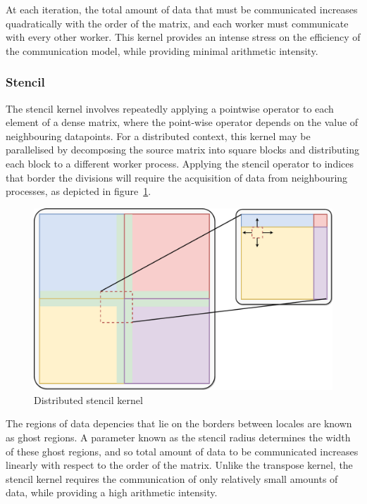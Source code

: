 At each iteration, the total amount of data that must be communicated
increases quadratically with the order of the matrix, and each worker
must communicate with every other worker. This kernel provides an
intense stress on the efficiency of the communication model, while
providing minimal arithmetic intensity.

\subsubsection{Stencil}

The stencil kernel involves repeatedly applying a pointwise operator to
each element of a dense matrix, where the point-wise operator depends on
the value of neighbouring datapoints. For a distributed context, this
kernel may be parallelised by decomposing the source matrix into square
blocks and distributing each block to a different worker process.
Applying the stencil operator to indices that border the divisions will
require the acquisition of data from neighbouring processes, as depicted
in figure~\ref{fig:stencil-diagram}.

\begin{figure}[htb]
  \includegraphics[width=\linewidth]{figs/Stencil.pdf}
  \caption{Distributed stencil kernel}
  \label{fig:stencil-diagram}
\end{figure}

The regions of data depencies that lie on the borders between locales
are known as ghost regions. A parameter known as the stencil radius
determines the width of these ghost regions, and so total amount of data
to be communicated increases linearly with respect to the order of the
matrix. Unlike the transpose kernel, the stencil kernel requires the
communication of only relatively small amounts of data, while providing
a high arithmetic intensity.
